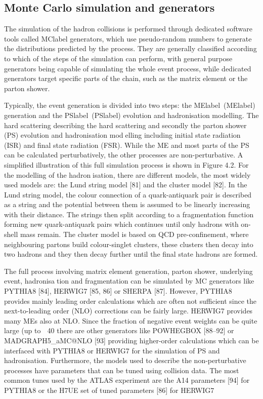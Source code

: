 \subsection{Monte Carlo simulation and generators}

The simulation of the hadron collisions is performed through dedicated software tools called
\acrshort{MClabel} generators, which use pseudo-random numbers to generate the distributions predicted by the process. They are generally classified according to which of the steps of the simulation can perform, with general purpose generators being capable of simulating the whole event process, while dedicated generators target specific parts of the chain, such as the matrix element or the parton shower.

Typically, the event generation is divided into two steps: the \acrlong{MElabel}~(\acrshort{MElabel}) generation and the \acrlong{PSlabel}~(\acrshort{PSlabel}) evolution and hadronisation modelling. 
The hard scattering describing the hard scattering and secondly the parton shower (PS) evolution and hadronisation modelling including initial state radiation (ISR) and final state radiation (FSR). While the ME and most
parts of the PS can be calculated perturbatively, the other processes are non-perturbative. A simplified
illustration of this full simulation process is shown in Figure 4.2. For the modelling of the hadronisation, there are different models, the most widely used models are: the Lund string model [81] and
the cluster model [82]. In the Lund string model, the colour connection of a quark-antiquark pair is
described as a string and the potential between them is assumed to be linearly increasing with their
distance. The strings then split according to a fragmentation function forming new quark-antiquark
pairs which continues until only hadrons with on-shell mass remain. The cluster model is based on
QCD pre-confinement, where neighbouring partons build colour-singlet clusters, these clusters then
decay into two hadrons and they then decay further until the final state hadrons are formed.

The full process involving matrix element generation, parton shower, underlying event, hadronisation and fragmentation can be simulated by MC generators like PYTHIA8 [84], HERWIG7 [85, 86]
or SHERPA [87]. However, PYTHIA8 provides mainly leading order calculations which are often not
sufficient since the next-to-leading order (NLO) corrections can be fairly large. HERWIG7 provides
many MEs also at NLO. Since the fraction of negative event weights can be quite large (up to
∼ 40%
there are other generators like POWHEGBOX [88–92] or MADGRAPH5_aMC@NLO [93] providing
higher-order calculations which can be interfaced with PYTHIA8 or HERWIG7 for the simulation of
PS and hadronisation.
Furthermore, the models used to describe the non-perturbative processes have parameters that can
be tuned using collision data. The most common tunes used by the ATLAS experiment are the A14
parameters [94] for PYTHIA8 or the H7UE set of tuned parameters [86] for HERWIG7

